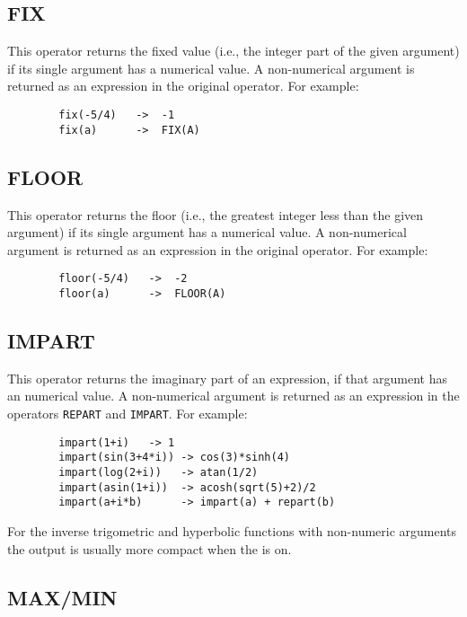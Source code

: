 \subsection{FIX}
\hypertarget{operator:FIX}{}
This operator returns the fixed value (i.e., the integer part of
the given argument) if its single argument has a numerical value.  A
non-numerical argument is returned as an expression in the original
operator.  For example:

\begin{verbatim}
        fix(-5/4)   ->  -1
        fix(a)      ->  FIX(A)
\end{verbatim}

\subsection{FLOOR}
\hypertarget{operator:FLOOR}{}
This operator returns the floor (i.e., the greatest integer less than
the given argument) if its single argument has a numerical value.  A
non-numerical argument is returned as an expression in the original
operator.  For example:

\begin{verbatim}
        floor(-5/4)   ->  -2
        floor(a)      ->  FLOOR(A)
\end{verbatim}

\subsection{IMPART}
\hypertarget{operator:IMPART}{}
This operator returns the imaginary part of an expression, if that argument
has an numerical value.  A non-numerical argument is returned as an expression
in the operators \texttt{REPART} and \texttt{IMPART}.  For example:
\begin{verbatim}
        impart(1+i)   -> 1
        impart(sin(3+4*i)) -> cos(3)*sinh(4)
        impart(log(2+i))   -> atan(1/2)
        impart(asin(1+i))  -> acosh(sqrt(5)+2)/2
        impart(a+i*b)      -> impart(a) + repart(b)
\end{verbatim}

For the inverse trigometric and hyperbolic functions with non-numeric arguments the output is usually more compact when the  is on.

\subsection{MAX/MIN}
\hypertarget{operator:MAX}{}
\hypertarget{operator:MIN}{}

